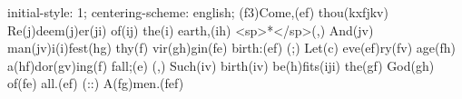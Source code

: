 initial-style: 1;
centering-scheme: english;
(f3)Come,(ef) thou(kxfjkv) Re(j)deem(j)er(ji) of(ij) the(i) earth,(ih) <sp>*</sp>(,)
And(jv) man(jv)i(i)fest(hg) thy(f) vir(gh)gin(fe) birth:(ef) (;)
Let(c) eve(ef)ry(fv) age(fh) a(hf)dor(gv)ing(f) fall;(e) (,)
Such(iv) birth(iv) be(h)fits(iji) the(gf) God(gh) of(fe) all.(ef) (::)
A(fg)men.(fef)